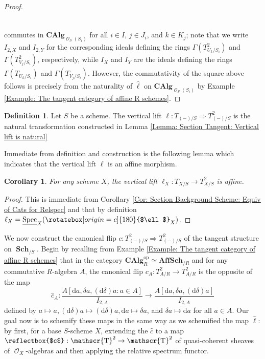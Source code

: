 \documentclass{amsart}
\newtheorem{corollary}[equation]{Corollary}
\theoremstyle{definition}
\newtheorem{definition}[equation]{Definition}
\DeclareMathOperator{\Tscr}{\mathscr{T}}
\DeclareMathOperator{\Ocal}{\mathcal{O}}
\DeclareMathOperator{\op}{op}
\DeclareMathOperator{\Spec}{Spec}
\newcommand{\CAlg}[1]{\mathbf{CAlg}_{#1}}
\newcommand{\RelSpec}[1]{\underline{\Spec}_{#1}}
\DeclareMathOperator{\Sch}{\mathbf{Sch}}
\numberwithin{equation}{subsection}
\begin{document}
\begin{proof}
\[\begin{tikzcd}
\end{tikzcd}
\]
commutes in $\CAlg{\Ocal_S(S_i)}$ for all $i \in I$, $j \in J_i$, and $k \in K_j$; note that we write $I_{2,X}$ and $I_{2,Y}$ for the corresponding ideals defining the rings $\Gamma(T_{U_k/S_i}^2)$ and $\Gamma(T_{V_j/S_i}^2)$, respectively, while $I_X$ and $I_Y$ are the ideals defining the rings $\Gamma(T_{U_k/S_i})$ and $\Gamma(T_{V_j/S_i})$. However, the commutativity of the square above follows is precisely from the naturality of $\hat{\ell}$ on $\CAlg{\Ocal_S(S_i)}$ by Example \ref{Example: The tangent category of affine R schemes}.
\end{proof}

\begin{definition}\label{Defn: Section Tangent: Vertical Lift over Schemes}
Let $S$ be a scheme. The vertical lift $\ell:T_{(-)/S} \Rightarrow  T^2_{(-)/S}$ is the natural transformation constructed in Lemma \ref{Lemma: Section Tangent: Vertical lift is natural}
\end{definition}
Immediate from definition and construction is the following lemma which indicates that the vertical lift $\ell$ is an affine morphism.
\begin{corollary}\label{Cor: Section Tangent: Vertical lift is affine}
For any scheme $X$, the vertical lift $\ell_X:T_{X/S} \to T^2_{X/S}$ is affine.
\end{corollary}
\begin{proof}
This is immediate from Corollary \ref{Cor: Section Background Scheme: Equiv of Cats for Relspec} and that by definition $\ell_X = \RelSpec{X}(\rotatebox[origin = c]{180}{$\ell$}_X)$.
\end{proof}

We now construct the canonical flip $c:T^{2}_{(-)/S} \Rightarrow T^{2}_{(-)/S}$ of the tangent structure on $\Sch_{/S}$. Begin by recalling from Example \ref{Example: The tangent category of affine R schemes} that in the category $\CAlg{R}^{\op} \simeq \mathbf{AffSch}_{/R}$ and for any commutative $R$-algebra $A$, the canonical flip $c_A:T^2_{A/R} \to T^2_{A/R}$ is the opposite of the map
\[
\hat{c}_A:\frac{A[\mathrm{d}a, \delta a, (\mathrm{d}\delta)a:a \in A]}{I_{2,A}} \longrightarrow \frac{A[\mathrm{d}a, \delta a, (\mathrm{d}\delta)a]}{I_{2,A}}
\]
defined by $a \mapsto a, (\mathrm{d}\delta)a \mapsto (\mathrm{d}\delta)a, \mathrm{d}a \mapsto \delta a$, and $\delta a \mapsto \mathrm{d}a$ for all $a \in A$. Our goal now is to schemify these maps in the same way as we schemified the map $\hat{\ell}$: by first, for a base $S$-scheme $X$, extending the $\hat{c}$ to a map $\reflectbox{$c$}:\Tscr^2 \to \Tscr^2$ of quasi-coherent sheaves of $\Ocal_X$-algebras and then applying the relative spectrum functor.
\end{document}
